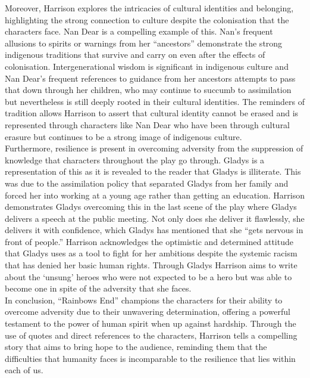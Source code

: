 \documentclass[a4paper]{article}
\begin{document}
Moreover, Harrison explores the intricacies of cultural identities and belonging, highlighting
the strong connection to culture despite the colonisation that the characters face. Nan Dear
is a compelling example of this. Nan’s frequent allusions to spirits or warnings from her
“ancestors” demonstrate the strong indigenous traditions that survive and carry on even after
the effects of colonisation. Intergenerational wisdom is significant in indigenous culture and
Nan Dear’s frequent references to guidance from her ancestors attempts to pass that down
through her children, who may continue to succumb to assimilation but nevertheless is still
deeply rooted in their cultural identities. The reminders of tradition allows Harrison to assert
that cultural identity cannot be erased and is represented through characters like Nan Dear
who have been through cultural erasure but continues to be a strong image of indigenous
culture.\\

Furthermore, resilience is present in overcoming adversity from the suppression of
knowledge that characters throughout the play go through. Gladys is a representation of this
as it is revealed to the reader that Gladys is illiterate. This was due to the assimilation policy
that separated Gladys from her family and forced her into working at a young age rather than
getting an education. Harrison demonstrates Gladys overcoming this in the last scene of the
play where Gladys delivers a speech at the public meeting. Not only does she deliver it
flawlessly, she delivers it with confidence, which Gladys has mentioned that she “gets
nervous in front of people.” Harrison acknowledges the optimistic and determined attitude
that Gladys uses as a tool to fight for her ambitions despite the systemic racism that has denied her basic human rights. Through Gladys Harrison aims to write about the ‘unsung’
heroes who were not expected to be a hero but was able to become one in spite of the
adversity that she faces.\\

In conclusion, “Rainbows End” champions the characters for their ability to overcome
adversity due to their unwavering determination, offering a powerful testament to the power
of human spirit when up against hardship. Through the use of quotes and direct references
to the characters, Harrison tells a compelling story that aims to bring hope to the audience,
reminding them that the difficulties that humanity faces is incomparable to the resilience that
lies within each of us.\\
\end{document}
